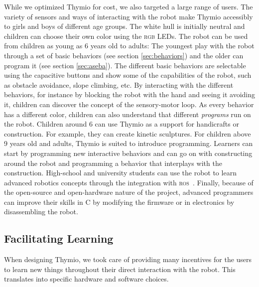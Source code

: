 \documentclass[letterpaper, 10 pt, conference]{ieeeconf}  %
\begin{document}
While we optimized Thymio for cost, we also targeted a large range of users.
The variety of sensors and ways of interacting with the robot make Thymio accessibly to girls and boys of different age groups.
The white hull is initially neutral and children can choose their own color using the \textsc{rgb} LEDs.
The robot can be used from children as young as 6 years old to adults:
The youngest play with the robot through a set of basic behaviors (see section \ref{sec:behaviors}) and the older can program it (see section \ref{sec:aseba}).
The different basic behaviors are selectable using the capacitive buttons and show some of the capabilities of the robot, such as obstacle avoidance, slope climbing, etc.
By interacting with the different behaviors, for instance by blocking the robot with the hand and seeing it avoiding it, children can discover the concept of the sensory-motor loop. 
As every behavior has a different color, children can also understand that different \emph{programs} run on the robot.
Children around 6 can use Thymio as a support for handicrafts or construction.
For example, they can create kinetic sculptures.
For children above 9 years old and adults, Thymio is suited to introduce programming.
Learners can start by programming new interactive behaviors and can go on with constructing around the robot and programming a behavior that interplays with the construction.
High-school and university students can use the robot to learn advanced robotics concepts through the integration with \textsc{ros}~\cite{quigley2009ros}.
Finally, because of the open-source and open-hardware nature of the project, advanced programmers can improve their skills in C by modifying the firmware or in electronics by disassembling the robot.

\subsection{Facilitating Learning}

When designing Thymio, we took care of providing many incentives for the users to learn new things throughout their direct interaction with the robot.
This translates into specific hardware and software choices.
\end{document}
